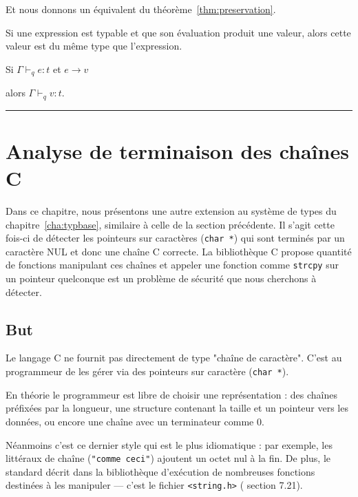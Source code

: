 


Et nous donnons un équivalent du théorème~\ref{thm:preservation}.

\begin{theorem}

  Si une expression est typable et que son évaluation produit une valeur, alors
  cette valeur est du même type que l'expression.

  Si $Γ ⊢_q e : t$ et $e → v$ %

  alors $Γ ⊢_q v : t$.

\end{theorem}

\begin{center}\rule{3in}{0.4pt}\end{center}

\clearpage

\section{Analyse de terminaison des chaînes C}%

Dans ce chapitre, nous présentons une autre extension au système de types du
chapitre~\ref{cha:typbase}, similaire à celle de la section précédente.
Il s'agit cette fois-ci de détecter les pointeurs sur caractères (\texttt{char
*}) qui sont terminés par un caractère NUL et donc une chaîne C correcte. La
bibliothèque C propose quantité de fonctions manipulant ces chaînes et appeler
une fonction comme \texttt{strcpy} sur un pointeur quelconque est un problème de
sécurité que nous cherchons à détecter.

\subsection{But}

Le langage C ne fournit pas directement de type "chaîne de caractère". C'est au
programmeur de les gérer via des pointeurs sur caractère (\texttt{char *}).

En théorie le programmeur est libre de choisir une représentation : des chaînes
préfixées par la longueur, une structure contenant la taille et un pointeur vers
les données, ou encore une chaîne avec un terminateur comme 0.

Néanmoins c'est ce dernier style qui est le plus idiomatique : par exemple, les
littéraux de chaîne (\texttt{"comme ceci"}) ajoutent un octet nul à la fin. De
plus, le standard décrit dans la bibliothèque d'exécution de nombreuses
fonctions destinées à les manipuler --- c'est le fichier
\texttt{\textless{}string.h\textgreater{}} (\cite{AnsiC} section 7.21).

